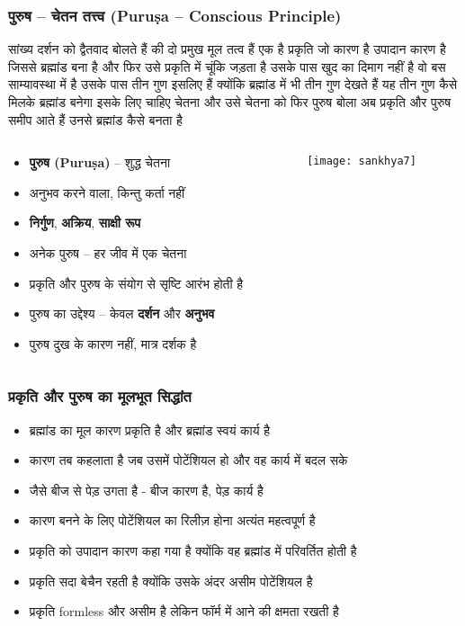 \begin{frame}[fragile]\frametitle{पुरुष – चेतन तत्त्व (Puruṣa – Conscious Principle)}
सांख्य दर्शन को द्वैतवाद बोलते हैं की दो प्रमुख मूल तत्व हैं एक है प्रकृति जो कारण है उपादान कारण है जिससे ब्रह्मांड बना है और फिर उसे
प्रकृति में चूंकि जड़ता है उसके पास खुद का दिमाग नहीं है वो बस साम्यावस्था में है उसके पास तीन गुण इसलिए हैं क्योंकि ब्रह्मांड में भी तीन गुण देखते हैं यह तीन गुण कैसे मिलके ब्रह्मांड बनेगा इसके लिए चाहिए चेतना और उसे चेतना को फिर पुरुष बोला अब प्रकृति और पुरुष समीप आते हैं उनसे ब्रह्मांड कैसे बनता है

\begin{columns}
    \begin{column}[T]{0.5\linewidth}
      \begin{itemize}
        \item \textbf{पुरुष (Puruṣa)} – शुद्ध चेतना
        \item अनुभव करने वाला, किन्तु कर्ता नहीं
        \item \textbf{निर्गुण}, \textbf{अक्रिय}, \textbf{साक्षी रूप}
        \item अनेक पुरुष – हर जीव में एक चेतना
        \item प्रकृति और पुरुष के संयोग से सृष्टि आरंभ होती है
        \item पुरुष का उद्देश्य – केवल \textbf{दर्शन} और \textbf{अनुभव}
        \item पुरुष दुख के कारण नहीं, मात्र दर्शक है
      \end{itemize}
    \end{column}
    \begin{column}[T]{0.5\linewidth}
      \begin{center}
        \texttt{[image: sankhya7]}
      \end{center}	
    \end{column}
\end{columns}
\end{frame}

\begin{frame}[fragile]\frametitle{प्रकृति और पुरुष का मूलभूत सिद्धांत}
      \begin{itemize}
          \item ब्रह्मांड का मूल कारण प्रकृति है और ब्रह्मांड स्वयं कार्य है
          \item कारण तब कहलाता है जब उसमें पोटेंशियल हो और वह कार्य में बदल सके
          \item जैसे बीज से पेड़ उगता है - बीज कारण है, पेड़ कार्य है
          \item कारण बनने के लिए पोटेंशियल का रिलीज़ होना अत्यंत महत्वपूर्ण है
          \item प्रकृति को उपादान कारण कहा गया है क्योंकि वह ब्रह्मांड में परिवर्तित होती है
          \item प्रकृति सदा बेचैन रहती है क्योंकि उसके अंदर असीम पोटेंशियल है
          \item प्रकृति formless और असीम है लेकिन फॉर्म में आने की क्षमता रखती है
      \end{itemize}
\end{frame}

